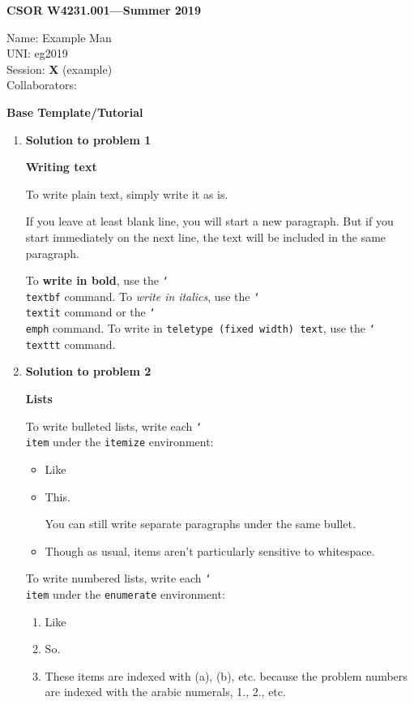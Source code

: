 \documentclass[11pt]{article}
\newcommand{\problemitem}[1]{
  \bigskip
  \item {\bf Solution to problem #1}
  \medskip
}
\newcommand{\BACKSLASH}{\char`\\ }
\begin{document}
\begin{flushright}
{\bf CSOR W4231.001---Summer 2019}
\end{flushright}
\begin{flushleft}
  Name: Example Man\\
  UNI: eg2019\\
  Session: {\bf X} (example) \\ %
  Collaborators: \\ %
\end{flushleft}

\bigskip
\centerline{\bf Base Template/Tutorial}

\begin{enumerate}

\problemitem{1}

{\large \textbf{Writing text}}

To write plain text, simply write it as is.

If you leave at least blank line, you will start a new paragraph.
But if you start immediately on the next line, the text will be included in the
same paragraph.

To \textbf{write in bold}, use the \texttt{\BACKSLASH textbf} command. To
\textit{write in} \emph{italics}, use the \texttt{\BACKSLASH textit} command or the
\texttt{\BACKSLASH emph} command. To write in \texttt{teletype (fixed width)
text}, use the \texttt{\BACKSLASH texttt} command.

\problemitem{2}

{\large \textbf{Lists}}

To write bulleted lists, write each \texttt{\BACKSLASH item} under the
\texttt{itemize} environment:

\begin{itemize}
  \item Like
  \item This.

    You can still write separate paragraphs under the same bullet.
  \item

    Though as usual, items aren't
particularly sensitive
    to whitespace.


\end{itemize}

To write numbered lists, write each \texttt{\BACKSLASH item} under the
\texttt{enumerate} environment:
\begin{enumerate}
  \item Like
  \item So.
  \item These items are indexed with (a), (b), etc. because the problem numbers
    are indexed with the arabic numerals, 1., 2., etc.
\end{enumerate}


\end{enumerate}
\end{document}
